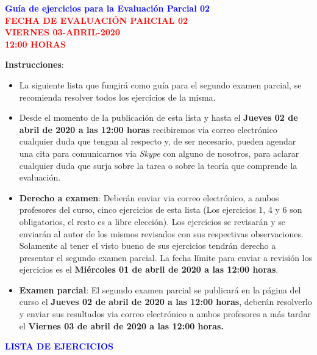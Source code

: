 \documentclass[12pt]{report}
\numberwithin{section}{chapter}
\begin{document}
\begin{center}
\textcolor{blue}{\textbf{\large Guía de ejercicios para la Evaluación Parcial 02}}\\
\vspace{0.5 cm}
\textcolor{red}{\textbf{\large FECHA DE EVALUACIÓN PARCIAL 02 \\ VIERNES 03-ABRIL-2020\\ 12:00 HORAS}}
\end{center}

\textbf{Instrucciones}:
\begin{itemize}
\item La siguiente lista que fungirá como guía para el segundo examen parcial, se recomienda resolver todos los ejercicios de la misma.

\item Desde el momento de la publicación de esta lista y hasta el \textbf{Jueves 02 de abril de 2020 a las 12:00 horas} recibiremos via correo electrónico cualquier duda que tengan al respecto y, de ser necesario, pueden agendar una cita para comunicarnos via \textit{Skype} con alguno de nosotros, para aclarar cualquier duda que surja sobre la tarea o sobre la teoría que comprende la evaluación.

\item \textbf{Derecho a examen}: Deberán enviar via correo electrónico, a ambos profesores del curso, cinco ejercicios de esta lista (Los ejercicios 1, 4 y 6 son obligatorios, el resto es a libre elección). Los ejercicios se revisarán y se enviarán al autor de los mismos revisados con sus respectivas observaciones. Solamente al tener el visto bueno de sus ejercicios tendrán derecho a presentar el segundo examen parcial. La fecha límite para enviar a revisión los ejercicios es el \textbf{Miércoles 01 de abril de 2020 a las 12:00 horas}.

\item \textbf{Examen parcial}: El segundo examen parcial se publicará en la página del curso el \textbf{Jueves 02 de abril de 2020 a las 12:00 horas}, deberán resolverlo y enviar sus resultados via correo electrónico a ambos profesores a más tardar el \textbf{Viernes 03 de abril de 2020 a las 12:00 horas.} 
\end{itemize}

\vspace{1cm}


\begin{center}
\textcolor{blue}{\textbf{\large LISTA DE EJERCICIOS}}
\end{center}
\end{document}
